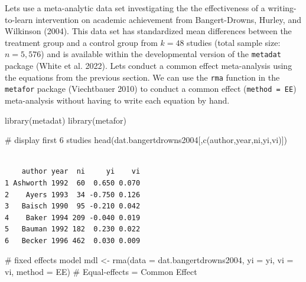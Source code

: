 \documentclass[
  letterpaper,
  DIV=11,
  numbers=noendperiod]{scrreprt}
\newenvironment{Shaded}{}{}
\newcommand{\AttributeTok}[1]{\textcolor[rgb]{0.00,0.34,0.68}{#1}}
\newcommand{\CommentTok}[1]{\textcolor[rgb]{0.54,0.53,0.53}{#1}}
\newcommand{\FunctionTok}[1]{\textcolor[rgb]{0.39,0.29,0.61}{#1}}
\newcommand{\NormalTok}[1]{\textcolor[rgb]{0.12,0.11,0.11}{#1}}
\newcommand{\OtherTok}[1]{\textcolor[rgb]{0.00,0.43,0.16}{#1}}
\newcommand{\StringTok}[1]{\textcolor[rgb]{0.75,0.01,0.01}{#1}}
\begin{document}
\begin{tcolorbox}[enhanced jigsaw, opacityback=0, coltitle=black, toprule=.15mm, colframe=quarto-callout-note-color-frame, bottomtitle=1mm, rightrule=.15mm, colbacktitle=quarto-callout-note-color!10!white, left=2mm, bottomrule=.15mm, breakable, title={Applied Example in R}, colback=white, opacitybacktitle=0.6, titlerule=0mm, arc=.35mm, leftrule=.75mm, toptitle=1mm]

Lets use a meta-analytic data set investigating the the effectiveness of
a writing-to-learn intervention on academic achievement from
Bangert-Drowns, Hurley, and Wilkinson (2004). This data set has
standardized mean differences between the treatment group and a control
group from \(k=48\) studies (total sample size: \(n=5,576\)) and is
available within the developmental version of the \texttt{metadat}
package (White et al. 2022). Lets conduct a common effect meta-analysis
using the equations from the previous section. We can use the
\texttt{rma} function in the \texttt{metafor} package (Viechtbauer 2010)
to conduct a common effect
(\texttt{method\ =\ \textquotesingle{}EE\textquotesingle{}})
meta-analysis without having to write each equation by hand.

\begin{Shaded}
\begin{Highlighting}[]
\FunctionTok{library}\NormalTok{(metadat)}
\FunctionTok{library}\NormalTok{(metafor)}

\CommentTok{\# display first 6 studies}
\FunctionTok{head}\NormalTok{(dat.bangertdrowns2004[,}\FunctionTok{c}\NormalTok{(}\StringTok{\textquotesingle{}author\textquotesingle{}}\NormalTok{,}\StringTok{\textquotesingle{}year\textquotesingle{}}\NormalTok{,}\StringTok{\textquotesingle{}ni\textquotesingle{}}\NormalTok{,}\StringTok{\textquotesingle{}yi\textquotesingle{}}\NormalTok{,}\StringTok{\textquotesingle{}vi\textquotesingle{}}\NormalTok{)])}
\end{Highlighting}
\end{Shaded}

\begin{verbatim}

    author year  ni     yi    vi 
1 Ashworth 1992  60  0.650 0.070 
2    Ayers 1993  34 -0.750 0.126 
3   Baisch 1990  95 -0.210 0.042 
4    Baker 1994 209 -0.040 0.019 
5   Bauman 1992 182  0.230 0.022 
6   Becker 1996 462  0.030 0.009 
\end{verbatim}

\begin{Shaded}
\begin{Highlighting}[]
\CommentTok{\# fixed effects model}
\NormalTok{mdl }\OtherTok{\textless{}{-}} \FunctionTok{rma}\NormalTok{(}\AttributeTok{data =}\NormalTok{ dat.bangertdrowns2004,}
           \AttributeTok{yi =}\NormalTok{ yi,}
           \AttributeTok{vi =}\NormalTok{ vi,}
           \AttributeTok{method =} \StringTok{\textquotesingle{}EE\textquotesingle{}}\NormalTok{) }\CommentTok{\# Equal{-}effects = Common Effect}


\end{Highlighting}
\end{Shaded}
\end{tcolorbox}
\end{document}
